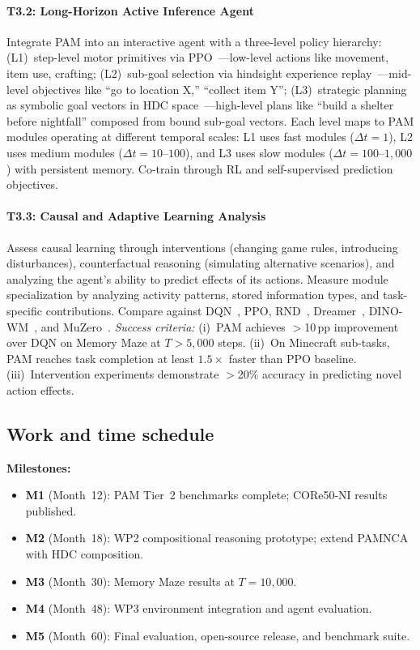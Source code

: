 \paragraph{T3.2: Long-Horizon Active Inference Agent}
Integrate PAM into an interactive agent with a three-level policy hierarchy: (L1)~step-level motor primitives via PPO~\cite{schulman2017ppo}---low-level actions like movement, item use, crafting; (L2)~sub-goal selection via hindsight experience replay~\cite{andrychowicz2017her}---mid-level objectives like ``go to location X,'' ``collect item Y''; (L3)~strategic planning as symbolic goal vectors in HDC space~\cite{kanerva2009hyperdimensional,rajendran2024causal}---high-level plans like ``build a shelter before nightfall'' composed from bound sub-goal vectors. Each level maps to PAM modules operating at different temporal scales: L1 uses fast modules ($\Delta t{=}1$), L2 uses medium modules ($\Delta t{=}10$--$100$), and L3 uses slow modules ($\Delta t{=}100$--$1{,}000$) with persistent memory. Co-train through RL and self-supervised prediction objectives.

\paragraph{T3.3: Causal and Adaptive Learning Analysis}
Assess causal learning through interventions (changing game rules, introducing disturbances), counterfactual reasoning (simulating alternative scenarios), and analyzing the agent's ability to predict effects of its actions. Measure module specialization by analyzing activity patterns, stored information types, and task-specific contributions. Compare against DQN~\cite{mnih2015dqn}, PPO, RND~\cite{burda2018rnd}, Dreamer~\cite{hafner2018dreamer}, DINO-WM~\cite{zhou2024dinowm}, and MuZero~\cite{schrittwieser2019muzero}.
\textit{Success criteria:} (i)~PAM achieves $>$10\,pp improvement over DQN on Memory Maze at $T{>}5{,}000$ steps. (ii)~On Minecraft sub-tasks, PAM reaches task completion at least $1.5{\times}$ faster than PPO baseline. (iii)~Intervention experiments demonstrate $>$20\% accuracy in predicting novel action effects.

\subsection{Work and time schedule}\label{sec:schedule}



\noindent\textbf{Milestones:}
\begin{itemize}[noitemsep,topsep=2pt]
  \item \textbf{M1} (Month~12): PAM Tier~2 benchmarks complete; CORe50-NI results published.
  \item \textbf{M2} (Month~18): WP2 compositional reasoning prototype; extend PAMNCA with HDC composition.
  \item \textbf{M3} (Month~30): Memory Maze results at $T{=}10{,}000$.
  \item \textbf{M4} (Month~48): WP3 environment integration and agent evaluation.
  \item \textbf{M5} (Month~60): Final evaluation, open-source release, and benchmark suite.
\end{itemize}

